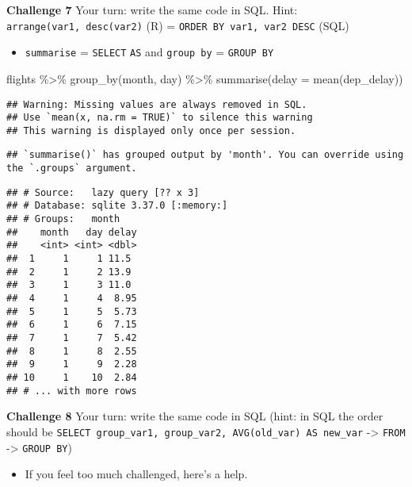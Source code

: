 \documentclass[
]{book}
\newenvironment{Shaded}{\begin{snugshade}}{\end{snugshade}}
\newcommand{\AttributeTok}[1]{\textcolor[rgb]{0.77,0.63,0.00}{#1}}
\newcommand{\FunctionTok}[1]{\textcolor[rgb]{0.00,0.00,0.00}{#1}}
\newcommand{\NormalTok}[1]{#1}
\newcommand{\SpecialCharTok}[1]{\textcolor[rgb]{0.00,0.00,0.00}{#1}}
\providecommand{\tightlist}{%
  \setlength{\itemsep}{0pt}\setlength{\parskip}{0pt}}
\begin{document}
\textbf{Challenge 7}
Your turn: write the same code in SQL.
Hint: \texttt{arrange(var1,\ desc(var2)} (R) = \texttt{ORDER\ BY\ var1,\ var2\ DESC} (SQL)

\begin{itemize}
\tightlist
\item
  \texttt{summarise} = \texttt{SELECT} \texttt{AS} and \texttt{group\ by} = \texttt{GROUP\ BY}
\end{itemize}

\begin{Shaded}
\begin{Highlighting}[]
\NormalTok{flights }\SpecialCharTok{\%\textgreater{}\%}
  \FunctionTok{group\_by}\NormalTok{(month, day) }\SpecialCharTok{\%\textgreater{}\%}
  \FunctionTok{summarise}\NormalTok{(}\AttributeTok{delay =} \FunctionTok{mean}\NormalTok{(dep\_delay)) }
\end{Highlighting}
\end{Shaded}

\begin{verbatim}
## Warning: Missing values are always removed in SQL.
## Use `mean(x, na.rm = TRUE)` to silence this warning
## This warning is displayed only once per session.
\end{verbatim}

\begin{verbatim}
## `summarise()` has grouped output by 'month'. You can override using the `.groups` argument.
\end{verbatim}

\begin{verbatim}
## # Source:   lazy query [?? x 3]
## # Database: sqlite 3.37.0 [:memory:]
## # Groups:   month
##    month   day delay
##    <int> <int> <dbl>
##  1     1     1 11.5 
##  2     1     2 13.9 
##  3     1     3 11.0 
##  4     1     4  8.95
##  5     1     5  5.73
##  6     1     6  7.15
##  7     1     7  5.42
##  8     1     8  2.55
##  9     1     9  2.28
## 10     1    10  2.84
## # ... with more rows
\end{verbatim}

\textbf{Challenge 8}
Your turn: write the same code in SQL (hint: in SQL the order should be \texttt{SELECT\ group\_var1,\ group\_var2,\ AVG(old\_var)\ AS\ new\_var} -\textgreater{} \texttt{FROM} -\textgreater{} \texttt{GROUP\ BY})

\begin{itemize}
\tightlist
\item
  If you feel too much challenged, here's a help.
\end{itemize}
\end{document}
